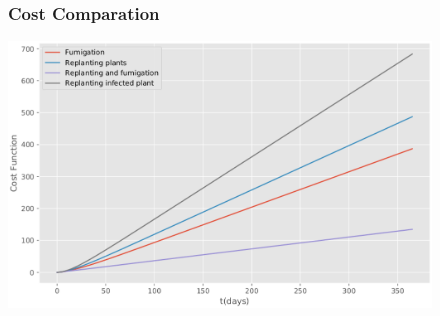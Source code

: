 \begin{frame}[plain]
	\begin{figure}
		\frametitle{Cost Comparation}
		\centering	
		\includegraphics[width=\linewidth]{Feathergraphics/Cost_Comparation_version_2.eps}
	\end{figure}	
\end{frame}
